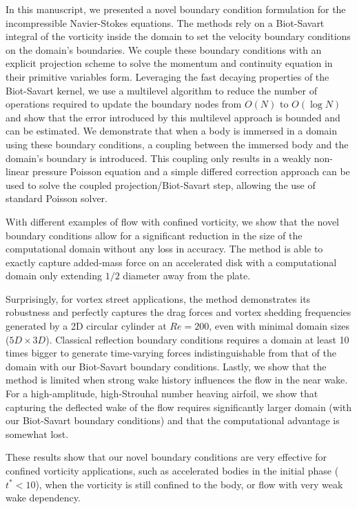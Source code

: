 \documentclass[preprint,12pt]{elsarticle}
\begin{document}
In this manuscript, we presented a novel boundary condition formulation for the incompressible Navier-Stokes equations. The methods rely on a Biot-Savart integral of the vorticity inside the domain to set the velocity boundary conditions on the domain's boundaries. We couple these boundary conditions with an explicit projection scheme to solve the momentum and continuity equation in their primitive variables form. Leveraging the fast decaying properties of the Biot-Savart kernel, we use a multilevel algorithm to reduce the number of operations required to update the boundary nodes from $O(N)$ to $O(\log N)$ and show that the error introduced by this multilevel approach is bounded and can be estimated. We demonstrate that when a body is immersed in a domain using these boundary conditions, a coupling between the immersed body and the domain's boundary is introduced. This coupling only results in a weakly non-linear pressure Poisson equation and a simple differed correction approach can be used to solve the coupled projection/Biot-Savart step, allowing the use of standard Poisson solver.

With different examples of flow with confined vorticity, we show that the novel boundary conditions allow for a significant reduction in the size of the computational domain without any loss in accuracy. The method is able to exactly capture added-mass force on an accelerated disk with a computational domain only extending $1/2$ diameter away from the plate. 

Surprisingly, for vortex street applications, the method demonstrates its robustness and perfectly captures the drag forces and vortex shedding frequencies generated by a 2D circular cylinder at $Re=200$, even with minimal domain sizes ($5D\times3D$). Classical reflection boundary conditions requires a domain at least 10 times bigger to generate time-varying forces indistinguishable from that of the domain with our Biot-Savart boundary conditions. Lastly, we show that the method is limited when strong wake history influences the flow in the near wake. For a high-amplitude, high-Strouhal number heaving airfoil, we show that capturing the deflected wake of the flow requires significantly larger domain (with our Biot-Savart boundary conditions) and that the computational advantage is somewhat lost.

These results show that our novel boundary conditions are very effective for confined vorticity applications, such as accelerated bodies in the initial phase ($t^*<10$), when the vorticity is still confined to the body, or flow with very weak wake dependency.
\end{document}
